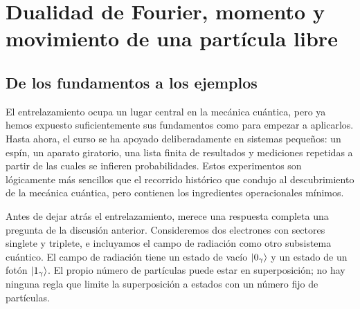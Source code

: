 \chapter{Dualidad de Fourier, momento y movimiento de una partícula libre}

\section{De los fundamentos a los ejemplos}

El entrelazamiento ocupa un lugar central en la mecánica cuántica, pero ya hemos expuesto suficientemente sus fundamentos como para empezar a aplicarlos. Hasta ahora, el curso se ha apoyado deliberadamente en sistemas pequeños: un espín, un aparato giratorio, una lista finita de resultados y mediciones repetidas a partir de las cuales se infieren probabilidades. Estos experimentos son lógicamente más sencillos que el recorrido histórico que condujo al descubrimiento de la mecánica cuántica, pero contienen los ingredientes operacionales mínimos.

\begin{classroomqa}\end{classroomqa}

\begin{classroomqa}\end{classroomqa}

Antes de dejar atrás el entrelazamiento, merece una respuesta completa una pregunta de la discusión anterior. Consideremos dos electrones con sectores singlete y triplete, e incluyamos el campo de radiación como otro subsistema cuántico. El campo de radiación tiene un estado de vacío \(\left\lvert0_\gamma\right\rangle\) y un estado de un fotón \(\left\lvert1_\gamma\right\rangle\). El propio número de partículas puede estar en superposición; no hay ninguna regla que limite la superposición a estados con un número fijo de partículas.

